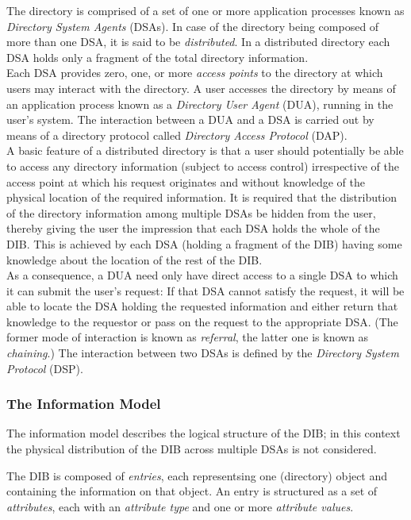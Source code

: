 The directory is comprised of a set of one or more application
processes known as {\em Directory System Agents} (DSAs). In case
of the directory being composed of more than one DSA, it is said to
be {\em distributed}. In a distributed directory each DSA holds
only a fragment of the total directory information.
\\ [1ex]
Each DSA provides zero, one, or more {\em access points} to the directory
at which users may interact with the directory. A user accesses the
directory by means of an application process known as a {\em Directory
User Agent} (DUA), running in the user's system.
The interaction between a DUA and a DSA is carried out by means of a
directory protocol called {\em Directory Access Protocol} (DAP).
\\ [1ex]
A basic feature of a distributed directory is that a user
should potentially be able to access any directory information
(subject to access control) irrespective of the access point at which
his request originates and without knowledge of the physical location
of the required information. It is required that the distribution
of the directory information among multiple DSAs be hidden from the
user, thereby giving the user the impression that each DSA holds
the whole of the DIB. This is achieved by each DSA (holding
a fragment of the DIB) having some knowledge about the location
of the rest of the DIB.
\\ [1ex]
As a consequence, a DUA need only have direct access to a single DSA to
which it can submit the user's request: If that DSA cannot
satisfy the request, it will be able to locate the DSA holding
the requested information and either return that knowledge to the
requestor or pass on the request to the appropriate DSA. (The former
mode of interaction is known as {\em referral}, the latter one
is known as {\em chaining}.) The interaction between two DSAs is
defined by the {\em Directory System Protocol} (DSP).


\subsubsection{The Information Model}

The information model describes the logical structure of the DIB; in
this context the physical distribution of the DIB across multiple DSAs
is not considered.

The DIB is composed of {\em entries}, each representsing one
(directory) object and containing the information on that object.
An entry is structured as a set of {\em attributes}, each with an
{\em attribute type} and one or more {\em attribute values}.

